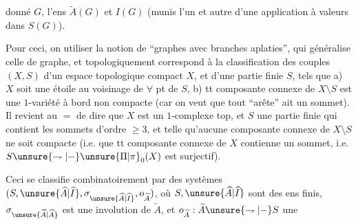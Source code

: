 donné $G$, l'ens $\widetilde A(G)$ et $I(G)$ (munis l'un et autre d'une application  à valeurs dans $S(G)$).

Pour ceci, on  utiliser la notion de ``graphes avec branches aplaties'', qui généralise celle de graphe, et topologiquement correspond à la classification des  couples $(X,S)$ d'un espace topologique compact $X$, et d'une partie finie $S$, tels que a) $X$ soit une étoile au voisinage de $\forall$ pt de $S$,  b)  tt composante connexe de $X\setminus S$ est une $1$-variété à bord non compacte (car on veut que tout  ``arête'' ait un sommet). Il revient au $=$ de dire que $X$ est un $1$-complexe top, et $S$ une partie finie qui contient les sommets d'ordre $\geq3$, et telle qu'aucune composante connexe de $X\setminus S$ ne soit compacte (i.e. que tt composante connexe de $X$ contienne un sommet, i.e. $S\unsure{\rightharpoondown|{-}}\unsure{\Pi|\pi}_0(X)$ est surjectif).

Ceci se classifie combinatoirement par des systèmes $(S,\unsure{\widehat A|\widehat I},\sigma_{\unsure{\widehat A|\widehat I}},o_{\widetilde A})$, où  $S,\unsure{\widehat A|\widehat I}$ sont des ens finis, $\sigma_{\unsure{\widetilde A|\widehat A}}$ est une involution de $\widetilde A$, et $o_{\widetilde A}:\widetilde A\unsure{\rightharpoondown|{-}}S$ une
